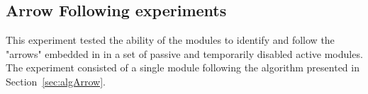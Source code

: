 \subsection{Arrow Following experiments}
\label{sec:mblocksExperimentsArrow}
This experiment tested the ability of the modules to identify and follow the "arrows" embedded in in a set of passive and temporarily disabled active modules. The experiment consisted of a single module following the algorithm presented in Section~\ref{sec:algArrow}.

